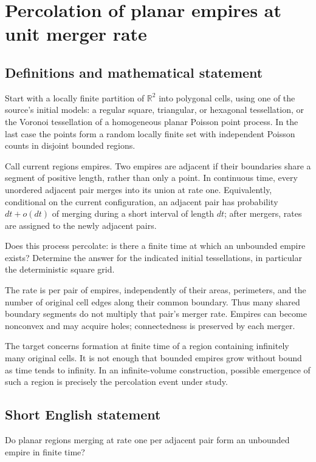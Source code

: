 \documentclass[11pt,a4paper]{article}
\begin{document}
\section*{Percolation of planar empires at unit merger rate}\label{statement}

\subsection{Definitions and mathematical statement}
Start with a locally finite partition of $\mathbb R^2$ into polygonal cells, using one of the source's initial models: a regular square, triangular, or hexagonal tessellation, or the Voronoi tessellation of a homogeneous planar Poisson point process. In the last case the points form a random locally finite set with independent Poisson counts in disjoint bounded regions.

Call current regions empires. Two empires are adjacent if their boundaries share a segment of positive length, rather than only a point. In continuous time, every unordered adjacent pair merges into its union at rate one. Equivalently, conditional on the current configuration, an adjacent pair has probability $dt+o(dt)$ of merging during a short interval of length $dt$; after mergers, rates are assigned to the newly adjacent pairs.

Does this process percolate: is there a finite time at which an unbounded empire exists? Determine the answer for the indicated initial tessellations, in particular the deterministic square grid.

The rate is per pair of empires, independently of their areas, perimeters, and the number of original cell edges along their common boundary. Thus many shared boundary segments do not multiply that pair's merger rate. Empires can become nonconvex and may acquire holes; connectedness is preserved by each merger.

The target concerns formation at finite time of a region containing infinitely many original cells. It is not enough that bounded empires grow without bound as time tends to infinity. In an infinite-volume construction, possible emergence of such a region is precisely the percolation event under study.
\subsection{Short English statement}
Do planar regions merging at rate one per adjacent pair form an unbounded empire in finite time?
\end{document}
